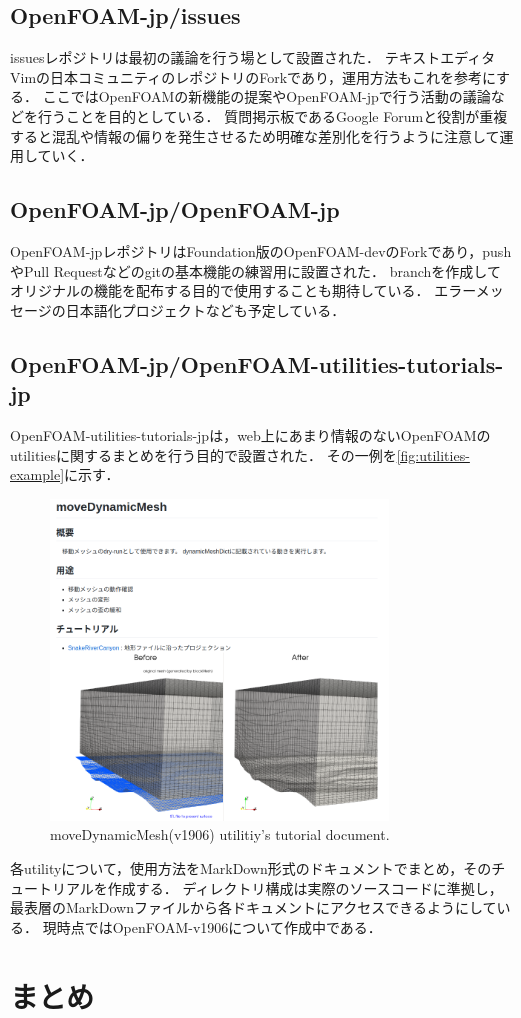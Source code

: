 \documentclass{ltjoc}
\begin{document}
\subsection{OpenFOAM-jp/issues}
issuesレポジトリ\cite{URL:OpenFOAM-jp-issues}は最初の議論を行う場として設置された．
テキストエディタVimの日本コミュニティのレポジトリ\cite{URL:vim-jp}のForkであり，運用方法もこれを参考にする．
ここではOpenFOAMの新機能の提案やOpenFOAM-jpで行う活動の議論などを行うことを目的としている．
質問掲示板であるGoogle Forumと役割が重複すると混乱や情報の偏りを発生させるため明確な差別化を行うように注意して運用していく．
%
\subsection{OpenFOAM-jp/OpenFOAM-jp}
OpenFOAM-jpレポジトリ\cite{URL:OpenFOAM-jp-OpenFOAM-jp}はFoundation版のOpenFOAM-devのForkであり，pushやPull Requestなどのgitの基本機能の練習用に設置された．
branchを作成してオリジナルの機能を配布する目的で使用することも期待している．
エラーメッセージの日本語化プロジェクトなども予定している．
%
\subsection{OpenFOAM-jp/OpenFOAM-utilities-tutorials-jp}
OpenFOAM-utilities-tutorials-jp\cite{URL:OpenFOAM-jp-OpenFOAM-utilities-tutorials-jp}は，web上にあまり情報のないOpenFOAMのutilitiesに関するまとめを行う目的で設置された．
その一例を\autoref{fig:utilities-example}に示す．
\begin{figure}[htbp]
\centering
\includegraphics[width=0.8\textwidth]{fig/utilities-example.png}
\caption{moveDynamicMesh(v1906) utilitiy's tutorial document.\cite{URL:OpenFOAM-jp-movedDynamicMesh}}
\label{fig:utilities-example}
\end{figure}
各utilityについて，使用方法をMarkDown形式のドキュメントでまとめ，そのチュートリアルを作成する．
ディレクトリ構成は実際のソースコードに準拠し，最表層のMarkDownファイルから各ドキュメントにアクセスできるようにしている．\cite{URL:OpenFOAM-jp-util-index}
現時点ではOpenFOAM-v1906について作成中である．
%
\section{まとめ}


\end{document}
